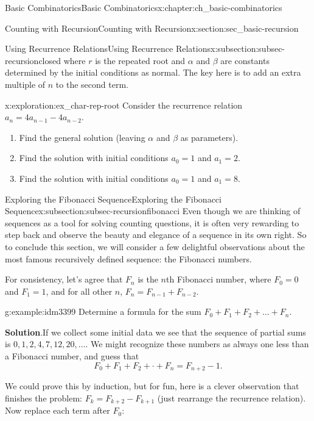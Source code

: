 \documentclass[oneside,10pt,]{book}
\numberwithin{equation}{chapter}
\begin{document}
\begin{chapterptx}{Basic Combinatorics}{}{Basic Combinatorics}{}{}{x:chapter:ch_basic-combinatorics}
\begin{sectionptx}{Counting with Recursion}{}{Counting with Recursion}{}{}{x:section:sec_basic-recursion}
\begin{subsectionptx}{Using Recurrence Relations}{}{Using Recurrence Relations}{}{}{x:subsection:subsec-recursionclosed}
where \(r\) is the repeated root and \(\alpha\) and \(\beta\) are constants determined by the initial conditions as normal. The key here is to add an extra multiple of \(n\) to the second term.%
\begin{exploration}{}{x:exploration:ex_char-rep-root}%
Consider the recurrence relation \(a_n = 4a_{n-1} - 4a_{n-2}\).%
\begin{enumerate}[font=\bfseries,label=(\alph*),ref=\alph*]
\item{}Find the general solution (leaving \(\alpha\) and \(\beta\) as parameters).%
\item{}Find the solution with initial conditions \(a_0 = 1\) and \(a_1 = 2\).%
\item{}Find the solution with initial conditions \(a_0 = 1\) and \(a_1 = 8\).%
\end{enumerate}
\end{exploration}
\end{subsectionptx}
%
%
\typeout{************************************************}
\typeout{************************************************}
%
\begin{subsectionptx}{Exploring the Fibonacci Sequence}{}{Exploring the Fibonacci Sequence}{}{}{x:subsection:subsec-recursionfibonacci}
Even though we are thinking of sequences as a tool for solving counting questions, it is often very rewarding to step back and observe the beauty and elegance of a sequence in its own right.  So to conclude this section, we will consider a few delightful observations about the most famous recursively defined sequence: the Fibonacci numbers.%
\par
For consistency, let's agree that \(F_n\) is the \(n\)th Fibonacci number, where \(F_0 = 0\) and \(F_1 = 1\), and for all other \(n\), \(F_n = F_{n-1} + F_{n-2}\).%
\begin{example}{}{g:example:idm3399}%
Determine a formula for the sum \(F_{0} + F_{1} + F_{2} + \ldots + F_{n}\).%
\par\smallskip%
\noindent\textbf{Solution}.\hypertarget{g:solution:idm3403}{}\quad{}If we collect some initial data we see that the sequence of partial sums is \(0, 1, 2, 4, 7, 12, 20, \ldots\).  We might recognize these numbers as always one less than a Fibonacci number, and guess that%
\begin{equation*}
F_0 + F_1 + F_2 + \cdot + F_n = F_{n+2} - 1.
\end{equation*}
%
\par
We could prove this by induction, but for fun, here is a clever observation that finishes the problem: \(F_k = F_{k+2} - F_{k+1}\) (just rearrange the recurrence relation).  Now replace each term after \(F_0\):%

\end{example}
\end{subsectionptx}
\end{sectionptx}
\end{chapterptx}
\end{document}
